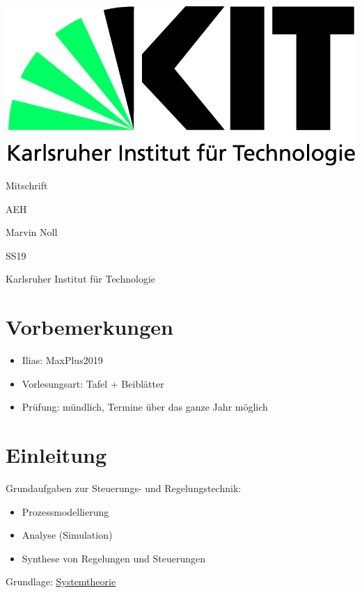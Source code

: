 \documentclass[12pt,a4paper]{scrartcl}
\numberwithin{equation}{section}
\begin{document}
  \pagestyle{empty}
  \begin{titlepage}
    \includegraphics[scale=0.45]{kit-logo.jpg} 
    \vspace*{2cm} 

 \begin{center} \large 
    Mitschrift
    \vspace*{2cm}

    {\huge AEH}
    \vspace*{2.5cm}

    Marvin Noll
    \vspace*{1.5cm}

    SS19
    \vspace*{4.5cm}


		Karlsruher Institut für Technologie
  \end{center}
\end{titlepage}
  \tableofcontents
\newpage
  \pagestyle{headings}
  
  
  

\section*{Vorbemerkungen}
\begin{itemize}
	\item Ilias: MaxPlus2019
	\item Vorlesungsart: Tafel + Beiblätter
	\item Prüfung: mündlich, Termine über das ganze Jahr möglich
\end{itemize}

\section{Einleitung}
Grundaufgaben zur Steuerungs- und Regelungstechnik:
\begin{itemize}
	\item Prozessmodellierung
	\item Analyse (Simulation)
	\item Synthese von Regelungen und Steuerungen 
\end{itemize}
Grundlage: \underline{Systemtheorie}
\end{document}
